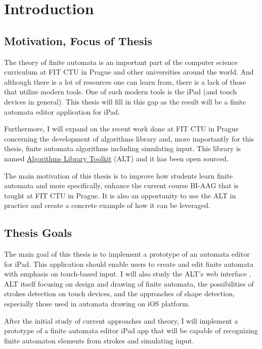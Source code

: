 \chapter{Introduction}
\setcounter{page}{1}

\section{Motivation, Focus of Thesis}

The theory of finite automata is an important part of the computer science curriculum at FIT CTU in Prague and other universities around the world. And although there is a lot of resources one can learn from, there is a lack of those that utilize modern tools. One of such modern tools is the iPad (and touch devices in general). This thesis will fill in this gap as the result will be a finite automata editor application for iPad.

Furthermore, I will expand on the recent work done at FIT CTU in Prague concerning the development of algorithms library and, more importantly for this thesis, finite automata algorithms including simulating input. This library is named \href{https://alt.fit.cvut.cz/}{Algorithms Library Toolkit} (ALT) \cite{alt} and it has been open sourced.

The main motivation of this thesis is to improve how students learn finite automata and more specifically, enhance the current course BI-AAG that is taught at FIT CTU in Prague. It is also an opportunity to use the ALT in practice and create a concrete example of how it can be leveraged.

\section{Thesis Goals}

The main goal of this thesis is to implement a prototype of an automata editor for iPad. This application should enable users to create and edit finite automata with emphasis on touch-based input.
I will also study the ALT's web interface \cite{state-maker} \cite{web-alt}, ALT itself focusing on design and drawing of finite automata, the possibilities of strokes detection on touch devices, and the approaches of shape detection, especially those used in automata drawing on iOS platform.

After the initial study of current approaches and theory, I will implement a prototype of a finite automata editor iPad app that will be capable of recognizing finite automaton elements from strokes and simulating input.

